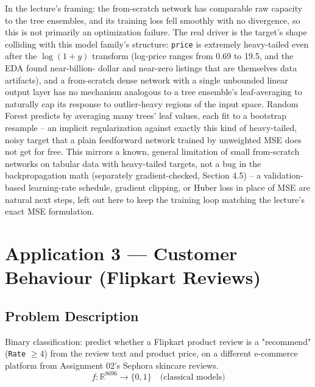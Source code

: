 \documentclass[11pt, a4paper]{article}
\begin{document}
In the lecture's framing: the from-scratch network has comparable raw capacity to the tree
ensembles, and its training loss fell smoothly with no divergence, so this is not primarily
an optimization failure. The real driver is the target's shape colliding with this model
family's structure: \texttt{price} is extremely heavy-tailed even after the
$\log(1+y)$ transform (log-price ranges from 0.69 to 19.5, and the EDA found near-billion-
dollar and near-zero listings that are themselves data artifacts), and a from-scratch dense
network with a single unbounded linear output layer has no mechanism analogous to a tree
ensemble's leaf-averaging to naturally cap its response to outlier-heavy regions of the
input space. Random Forest predicts by averaging many trees' leaf values, each fit to a
bootstrap resample -- an implicit regularization against exactly this kind of heavy-tailed,
noisy target that a plain feedforward network trained by unweighted MSE does not get for
free. This mirrors a known, general limitation of small from-scratch networks on tabular
data with heavy-tailed targets, not a bug in the backpropagation math (separately
gradient-checked, Section 4.5) -- a validation-based learning-rate schedule, gradient
clipping, or Huber loss in place of MSE are natural next steps, left out here to keep the
training loop matching the lecture's exact MSE formulation.

\section{Application 3 --- Customer Behaviour (Flipkart Reviews)}

\subsection{Problem Description}
Binary classification: predict whether a Flipkart product review is a "recommend"
(\texttt{Rate} $\geq 4$) from the review text and product price, on a different e-commerce
platform from Assignment 02's Sephora skincare reviews.
\[
f: \mathbb{R}^{8696} \longrightarrow \{0, 1\} \quad \text{(classical models)}
\]
\end{document}

